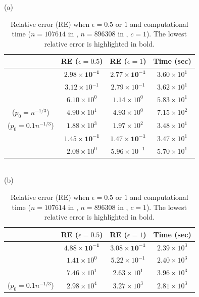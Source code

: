 \begin{table}[t]
  \caption{Relative error (RE) when $\epsilon=0.5$ or $1$ and computational time ($n=107614$ in \Gplus{}, $n=896308$ in \IMDB{}, $c=1$). 
  The lowest relative error is highlighted in bold.
  }
  
  \centering
  (a) \Gplus{}\\
  \begin{tabular}{|c|c|c|c|}
    \hline
    & RE ($\epsilon=0.5$) & RE ($\epsilon=1$) & Time (sec)\\ \hline
    \AlgWSTriVR{} & $\bm{2.98 \times 10^{-1}}$ & $\bm{2.77 \times 10^{-1}}$ & $3.60 \times 10^1$ \\ \hline
    \AlgWSTri{} & $3.12 \times 10^{-1}$ & $2.79 \times 10^{-1}$ & $3.62 \times 10^1$ \\ \hline
    \AlgWLTri{} & $6.10 \times 10^0$ & $1.14 \times 10^0$ & $5.83 \times 10^1$ \\ \hline
    \AlgARRTri{} ($p_0=n^{-1/3}$) & $4.90 \times 10^1$ & $4.93 \times 10^0$ & $7.15 \times 10^2$ \\ \hline
    \hspace{-0.5mm}\AlgARRTri{} ($p_0=0.1n^{-1/3}$)\hspace{-0.5mm} & $1.88 \times 10^3$ & $1.97 \times 10^2$ & $3.48 \times 10^1$ \\ \hline \hline
    \AlgWSCyc{} & $\bm{1.45 \times 10^{-1}}$ & $\bm{1.47 \times 10^{-1}}$ & $3.47 \times 10^1$ \\ \hline
    \AlgWLCyc{} & $2.08 \times 10^0$ & $5.96 \times 10^{-1}$ & $5.70 \times 10^1$ \\ \hline
  \end{tabular}\\
  (b) \IMDB{}\\
  \begin{tabular}{|c|c|c|c|}
    \hline
    & RE ($\epsilon=0.5$) & RE ($\epsilon=1$) & Time (sec)\\ \hline
    \AlgWSTriVR{} & $\bm{4.88 \times 10^{-1}}$ & $\bm{3.08 \times 10^{-1}}$ & $2.39 \times 10^3$ \\ \hline
    \AlgWSTri{} & $1.41 \times 10^0$ & $5.22 \times 10^{-1}$ & $2.40 \times 10^3$ \\ \hline
    \AlgWLTri{} & $7.46 \times 10^1$ & $2.63 \times 10^1$ & $3.96 \times 10^3$ \\ \hline
    \hspace{-0.5mm}\AlgARRTri{} ($p_0=0.1n^{-1/3}$)\hspace{-0.5mm} & $2.98 \times 10^4$ & $3.27 \times 10^3$ & $2.81 \times 10^3$ \\ \hline \hline

\end{tabular}
\end{table}

